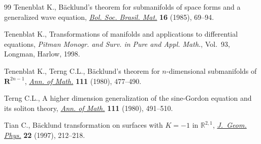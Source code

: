 \documentclass[pdftex]{sigma}
\numberwithin{equation}{section}
\begin{document}
\begin{thebibliography}{99}
Tenenblat K., B\"acklund's theorem for submanifolds of space forms and a
 generalized wave equation, \href{https://doi.org/10.1007/BF02584802}{\textit{Bol. Soc. Brasil. Mat.}} \textbf{16}
 (1985), 69--94.

Tenenblat K., Transformations of manifolds and applications to differential
 equations, \textit{Pitman Monogr. and Surv. in Pure and Appl. Math.},
 Vol.~93, Longman, Harlow, 1998.

Tenenblat K., Terng C.L., B\"acklund's theorem for {$n$}-dimensional
 submanifolds of {${\mathbf R}^{2n-1}$}, \href{https://doi.org/10.2307/1971105}{\textit{Ann. of Math.}} \textbf{111}
 (1980), 477--490.

Terng C.L., A higher dimension generalization of the sine-{G}ordon equation and
 its soliton theory, \href{https://doi.org/10.2307/1971106}{\textit{Ann. of Math.}} \textbf{111} (1980), 491--510.

Tian C., B\"acklund transformation on surfaces with {$K=-1$} in {${\mathbb
 R}^{2,1}$}, \href{https://doi.org/10.1016/S0393-0440(96)00036-8}{\textit{J.~Geom. Phys.}} \textbf{22} (1997), 212--218.

\end{thebibliography}\LastPageEnding
\end{document}
